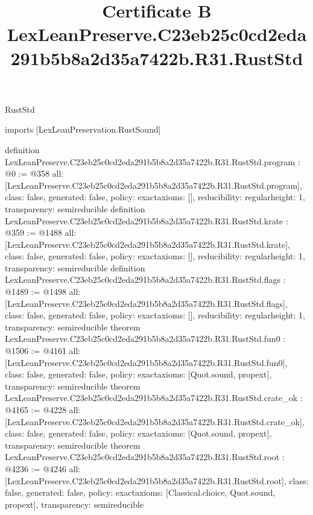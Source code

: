 \begin{lexlean}{RustStd}
\title{Certificate B LexLeanPreserve.C23eb25c0cd2eda291b5b8a2d35a7422b.R31.RustStd}
\begin{coremodule}
imports [LexLeanPreservation.RustSound]

definition LexLeanPreserve.C23eb25c0cd2eda291b5b8a2d35a7422b.R31.RustStd.program : @0 := @358 {
  all: [LexLeanPreserve.C23eb25c0cd2eda291b5b8a2d35a7422b.R31.RustStd.program],
  class: false,
  generated: false,
  policy: exact{axioms: []},
  reducibility: regular{height: 1},
  transparency: semireducible
}
definition LexLeanPreserve.C23eb25c0cd2eda291b5b8a2d35a7422b.R31.RustStd.krate : @359 := @1488 {
  all: [LexLeanPreserve.C23eb25c0cd2eda291b5b8a2d35a7422b.R31.RustStd.krate],
  class: false,
  generated: false,
  policy: exact{axioms: []},
  reducibility: regular{height: 1},
  transparency: semireducible
}
definition LexLeanPreserve.C23eb25c0cd2eda291b5b8a2d35a7422b.R31.RustStd.flags : @1489 := @1498 {
  all: [LexLeanPreserve.C23eb25c0cd2eda291b5b8a2d35a7422b.R31.RustStd.flags],
  class: false,
  generated: false,
  policy: exact{axioms: []},
  reducibility: regular{height: 1},
  transparency: semireducible
}
theorem LexLeanPreserve.C23eb25c0cd2eda291b5b8a2d35a7422b.R31.RustStd.fun0 : @1506 := @4161 {
  all: [LexLeanPreserve.C23eb25c0cd2eda291b5b8a2d35a7422b.R31.RustStd.fun0],
  class: false,
  generated: false,
  policy: exact{axioms: [Quot.sound, propext]},
  transparency: semireducible
}
theorem LexLeanPreserve.C23eb25c0cd2eda291b5b8a2d35a7422b.R31.RustStd.crate_ok : @4165 := @4228 {
  all: [LexLeanPreserve.C23eb25c0cd2eda291b5b8a2d35a7422b.R31.RustStd.crate_ok],
  class: false,
  generated: false,
  policy: exact{axioms: [Quot.sound, propext]},
  transparency: semireducible
}
theorem LexLeanPreserve.C23eb25c0cd2eda291b5b8a2d35a7422b.R31.RustStd.root : @4236 := @4246 {
  all: [LexLeanPreserve.C23eb25c0cd2eda291b5b8a2d35a7422b.R31.RustStd.root],
  class: false,
  generated: false,
  policy: exact{axioms: [Classical.choice, Quot.sound, propext]},
  transparency: semireducible
}


\end{coremodule}
\end{lexlean}
